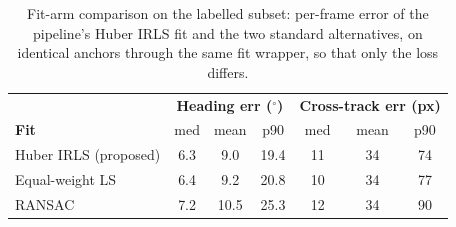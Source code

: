 {\renewcommand{\arraystretch}{1.2}
\begin{table}[!ht]
  \centering
  \caption{Fit-arm comparison on the labelled subset: per-frame error of the
    pipeline's Huber IRLS fit and the two standard alternatives, on identical
    anchors through the same fit wrapper, so that only the loss differs.}
  \label{tab:res-fitarm}
  \begin{tabular}{lccc@{\hskip 1.2em}ccc}
    \hline
    & \multicolumn{3}{c}{\textbf{Heading err ($^\circ$)}} & \multicolumn{3}{c}{\textbf{Cross-track err (px)}} \\
    \textbf{Fit} & med & mean & p90 & med & mean & p90 \\
    \hline
    Huber IRLS (proposed) & 6.3 & 9.0  & 19.4 & 11 & 34 & 74  \\
    Equal-weight LS       & 6.4 & 9.2  & 20.8 & 10 & 34 & 77  \\
    RANSAC                & 7.2 & 10.5 & 25.3 & 12 & 34 & 90  \\
    \hline
  \end{tabular}
\end{table}}

